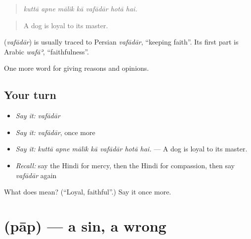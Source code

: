 \begin{quote}
      
\end{quote}

\begin{quote}
\emph{kuttā apne mālik kā vafādār hotā hai.}
\end{quote}

\begin{quote}
A dog is loyal to its master.
\end{quote}

\begin{cousinweb}
\textbf{} (\emph{vafādār}) is usually traced to Persian \emph{vafādār}, \textquotedblleft{}keeping faith\textquotedblright{}. Its first part is Arabic \emph{wafāʾ}, \textquotedblleft{}faithfulness\textquotedblright{}.
\end{cousinweb}

\begin{grammarlens}[title={What you've built}]
One more word for giving reasons and opinions.
\end{grammarlens}

\subsection*{Your turn}
\begin{itemize}
\raggedright
  \item \emph{Say it:} \emph{vafādār}
  \item \emph{Say it:} \emph{vafādār}, once more
  \item \emph{Say it:} \emph{kuttā apne mālik kā vafādār hotā hai.} — A dog is loyal to its master.
  \item \emph{Recall:} say the Hindi for mercy, then the Hindi for compassion, then say \emph{vafādār} again
\end{itemize}

\begin{tcolorbox}[breakable,colback=teal!4,colframe=teal!35!black,title={Before you move on}]
What does  mean? (\textquotedblleft{}Loyal, faithful\textquotedblright{}.) Say it once more.
\end{tcolorbox}
\section[\texorpdfstring{\hi{पाप} (pāp)}{पाप (pāp)}]{ (pāp) — a sin, a wrong}

\label{lesson:HI-C372-pap}



